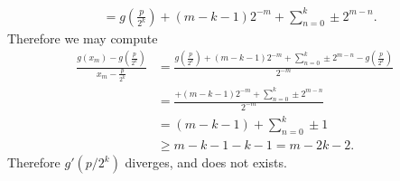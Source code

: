 \documentclass[12pt, letterpaper]{article}
\begin{document}
\begin{enumerate}
\begin{enumerate}
\begin{align*}
		&= g(\frac{p}{2^k}) +(m-k-1)2^{-m} + \sum_{n=0}^k \pm 2^{m-n}. 
		\end{align*}
		Therefore we may compute 
		\begin{align*}
			\frac{g(x_m)-g(\frac{p}{2^k})}{x_m - \frac{p}{2^k}} &= \frac{g(\frac{p}{2^k}) +(m-k-1)2^{-m} + \sum_{n=0}^k \pm 2^{m-n}-g(\frac{p}{2^k})}{2^{-m}}\\
			&= \frac{ +(m-k-1)2^{-m} + \sum_{n=0}^k \pm 2^{m-n}}{2^{-m}}\\
			&= (m-k-1) + \sum_{n=0}^k \pm 1\\
			&\geq  m-k-1 - k - 1 = m -2k -2.
		\end{align*}
		Therefore $g'(p/2^k)$ diverges, and does not exists.  
	\end{enumerate}
\end{enumerate}
\end{document}
